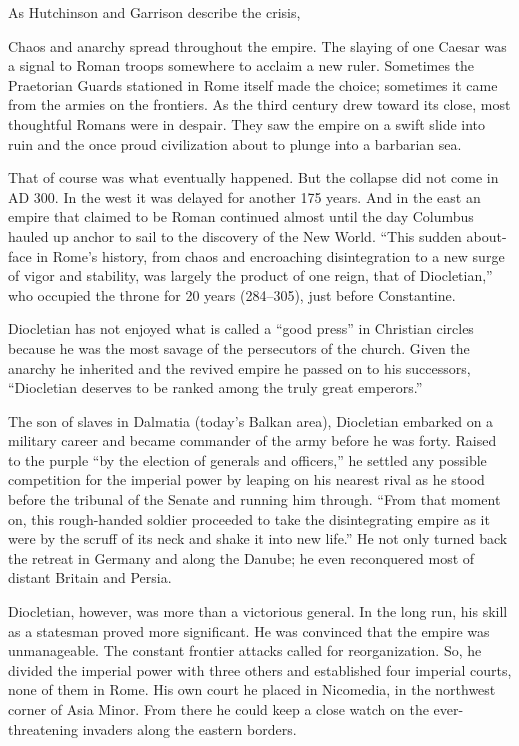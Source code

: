 As Hutchinson and Garrison describe the crisis,

\begin{blockquote}
Chaos and anarchy spread throughout the empire. The slaying of one Caesar was a signal to Roman
troops somewhere to acclaim a new ruler. Sometimes the Praetorian Guards stationed in Rome itself
made the choice; sometimes it came from the armies on the frontiers. As the third century drew
toward its close, most thoughtful Romans were in despair. They saw the empire on a swift slide into
ruin and the once proud civilization about to plunge into a barbarian sea.
\end{blockquote}

That of course was what eventually happened. But the collapse did not come in AD 300. In the west it
was delayed for another 175 years. And in the east an empire that claimed to be Roman continued
almost until the day Columbus hauled up anchor to sail to the discovery of the New World. “This
sudden about-face in Rome’s history, from chaos and encroaching disintegration to a new surge of
vigor and stability, was largely the product of one reign, that of Diocletian,” who occupied the
throne for 20 years (284–305), just before Constantine.

Diocletian has not enjoyed what is called a “good press” in Christian circles because he was the
most savage of the persecutors of the church. Given the anarchy he inherited and the revived empire
he passed on to his successors, “Diocletian deserves to be ranked among the truly great emperors.”

The son of slaves in Dalmatia (today’s Balkan area), Diocletian embarked on a military career and
became commander of the army before he was forty. Raised to the purple “by the election of generals
and officers,” he settled any possible competition for the imperial power by leaping on his nearest
rival as he stood before the tribunal of the Senate and running him through. “From that moment on,
this rough-handed soldier proceeded to take the disintegrating empire as it were by the scruff of
its neck and shake it into new life.” He not only turned back the retreat in Germany and along the
Danube; he even reconquered most of distant Britain and Persia.

Diocletian, however, was more than a victorious general. In the long run, his skill as a statesman
proved more significant. He was convinced that the empire was unmanageable. The constant frontier
attacks called for reorganization. So, he divided the imperial power with three others and
established four imperial courts, none of them in Rome. His own court he placed in Nicomedia, in the
northwest corner of Asia Minor. From there he could keep a close watch on the ever-threatening
invaders along the eastern borders.

